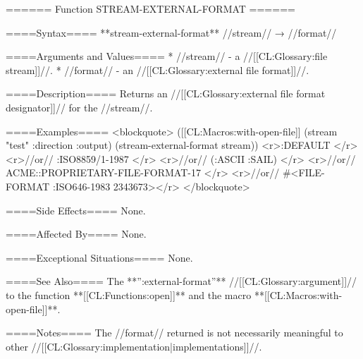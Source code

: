 ====== Function STREAM-EXTERNAL-FORMAT ======

====Syntax====
**stream-external-format** //stream// → //format//

====Arguments and Values====
  * //stream// - a //[[CL:Glossary:file stream]]//.
  * //format// - an //[[CL:Glossary:external file format]]//.

====Description====
Returns an //[[CL:Glossary:external file format designator]]// for the //stream//.

====Examples====
<blockquote>
([[CL:Macros:with-open-file]] (stream "test" :direction :output) 
  (stream-external-format stream)) 
<r>:DEFAULT </r>
<r>//or// :ISO8859/1-1987 </r>
<r>//or// (:ASCII :SAIL) </r>
<r>//or// ACME::PROPRIETARY-FILE-FORMAT-17 </r>
<r>//or// #<FILE-FORMAT :ISO646-1983 2343673></r>
</blockquote>

====Side Effects====
None.

====Affected By====
None.

====Exceptional Situations====
None.

====See Also====
The **'':external-format''** //[[CL:Glossary:argument]]// to the function **[[CL:Functions:open]]** and the macro **[[CL:Macros:with-open-file]]**.

====Notes====
The //format// returned is not necessarily meaningful to other //[[CL:Glossary:implementation|implementations]]//.

